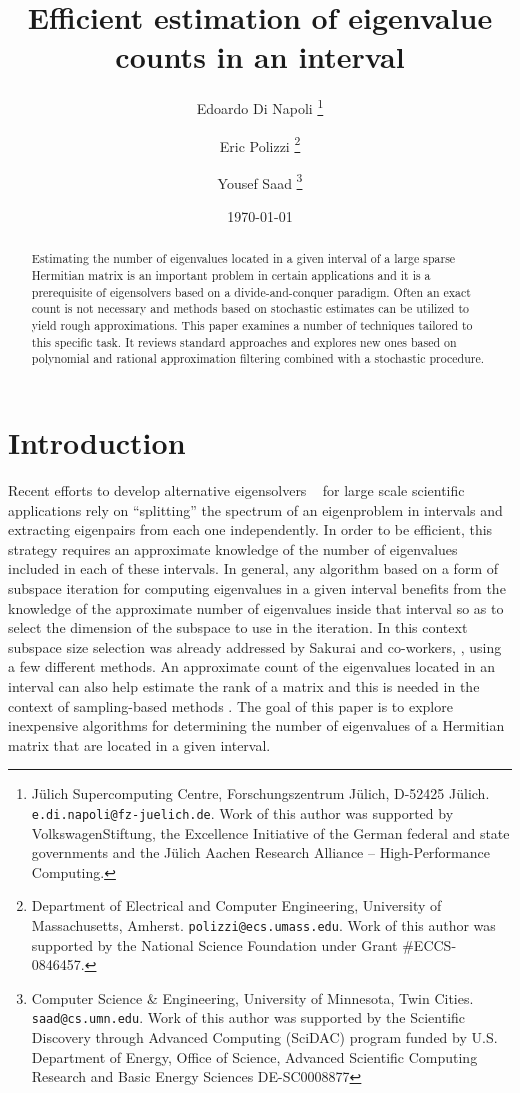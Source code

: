 \documentclass[12pt]{article}		\usepackage{tabls,multirow}
\title{Efficient estimation of eigenvalue counts in an interval}
\author{Edoardo Di Napoli
\thanks{J\"ulich Supercomputing Centre, Forschungszentrum J\"ulich, D-52425 J\"ulich. 
        {\tt e.di.napoli@fz-juelich.de}.
Work of this author was supported by VolkswagenStiftung,
       the Excellence Initiative of the German federal and state governments 
       and the J\"ulich Aachen Research Alliance -- High-Performance Computing.}
\and
Eric Polizzi
\thanks{Department of Electrical and Computer Engineering,
        University of Massachusetts, Amherst. 
{\tt polizzi@ecs.umass.edu}. Work of this author was supported by the
       National Science Foundation under Grant \#ECCS-0846457.}
\and
Yousef Saad 
\thanks{Computer Science \& Engineering,
        University of Minnesota, Twin Cities. 
{\tt saad@cs.umn.edu}. 
Work of this author 
was supported by        the Scientific Discovery through Advanced Computing (SciDAC) program funded by
       U.S. Department of Energy, Office of Science, Advanced Scientific Computing Research and Basic Energy
       Sciences DE-SC0008877}
}
\date{\today}
\begin{document}
 

\maketitle 

\begin{abstract}
  Estimating the number of eigenvalues  located in a given interval of
  a large sparse  Hermitian matrix is an important  problem in certain
  applications and  it is  a prerequisite of  eigensolvers based  on a
  divide-and-conquer paradigm.  Often an  exact count is not necessary
  and methods based  on stochastic estimates can be  utilized to yield
  rough approximations.   This paper  examines a number  of techniques
  tailored to this specific  task.  It reviews standard approaches and
  explores  new ones  based on  polynomial and  rational approximation
  filtering combined with a stochastic procedure.
\end{abstract} 



\section{Introduction}
Recent efforts to develop alternative eigensolvers
~\cite{Schofield-al-2011,FEAST,SakSig03} for large scale scientific
applications rely on ``splitting'' the spectrum of an eigenproblem in
intervals and extracting eigenpairs from each one independently. In
order to be efficient, this strategy requires an approximate knowledge
of the number of eigenvalues included in each of these intervals.  In
general, any algorithm based on a form of subspace iteration for
computing eigenvalues in a given interval benefits from the knowledge
of the approximate number of eigenvalues inside that interval so as to
select the dimension of the subspace to use in the iteration. In this
context subspace size selection was already addressed by Sakurai and
co-workers,
\cite{FutamuraSakuraiEigCnt,Senzaki-al-eigCnt-2010,Maeda-al-eigCnt-2011},
using a few different methods.  An approximate count of the
eigenvalues located in an interval can also help estimate the rank of
a matrix and this is needed in the context of sampling-based methods
\cite{halko-al-survey-11,Mahoney-book}.  The goal of this paper is to
explore inexpensive algorithms for determining the number of
eigenvalues of a Hermitian matrix that are located in a given
interval.
\end{document}
